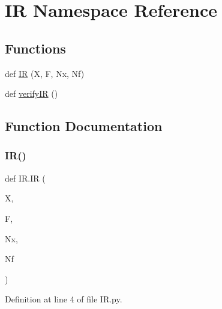 \hypertarget{namespaceIR}{}\section{IR Namespace Reference}
\label{namespaceIR}
\subsection*{Functions}
\begin{DoxyCompactItemize}
\item 
def \hyperlink{namespaceIR_ae50bbbd323bc928d9e274617de58d72f}{IR} (X, F, Nx, Nf)
\item 
def \hyperlink{namespaceIR_aeaee615025a0b0c13500382312ba7745}{verify\+IR} ()
\end{DoxyCompactItemize}


\subsection{Function Documentation}
\hypertarget{namespaceIR_ae50bbbd323bc928d9e274617de58d72f}{}\label{namespaceIR_ae50bbbd323bc928d9e274617de58d72f} 
\subsubsection{\texorpdfstring{I\+R()}{IR()}}
{\footnotesize\ttfamily def I\+R.\+IR (\begin{DoxyParamCaption}\item[{}]{X,  }\item[{}]{F,  }\item[{}]{Nx,  }\item[{}]{Nf }\end{DoxyParamCaption})}



Definition at line 4 of file I\+R.\+py.


